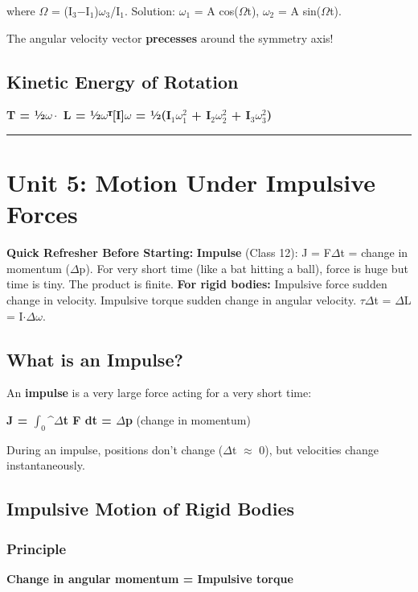 \documentclass[12pt,a4paper,openany]{book}
\begin{document}
{{where $\Omega$ = (I$_3$−I$_1$)$\omega_3$/I$_1$. Solution: $\omega_1$ = A cos($\Omega$t), $\omega_2$ = A sin($\Omega$t).

The angular velocity vector \textbf{precesses} around the symmetry axis!

\subsection{Kinetic Energy of Rotation}

\textbf{T = ½$\omega\cdot$ L = ½$\omega$ᵀ[I]$\omega$ = ½(I$_1\omega_1^2$ + I$_2\omega_2^2$ + I$_3\omega_3^2$)}

\bigskip\noindent\rule{\textwidth}{0.4pt}\bigskip

\section{Unit 5: Motion Under Impulsive Forces}

\begin{prereqbox}
 \textbf{Quick Refresher Before Starting:}
\textbf{Impulse} (Class 12): J = F$\Delta$t = change in momentum ($\Delta$p).
For very short time (like a bat hitting a ball), force is huge but time is tiny. The product is finite.
\textbf{For rigid bodies:} Impulsive force  sudden change in velocity.
Impulsive torque  sudden change in angular velocity. $\tau\Delta$t = $\Delta$L = I$\cdot\Delta\omega$.
\end{prereqbox}


\subsection{What is an Impulse?}

An \textbf{impulse} is a very large force acting for a very short time:

\textbf{J = $\int_0$^$\Delta$t F dt = $\Delta$p} (change in momentum)

During an impulse, positions don't change ($\Delta$t $\approx$ 0), but velocities change instantaneously.

\subsection{Impulsive Motion of Rigid Bodies}

\subsubsection{Principle}
\textbf{Change in angular momentum = Impulsive torque}

}}
\end{document}
